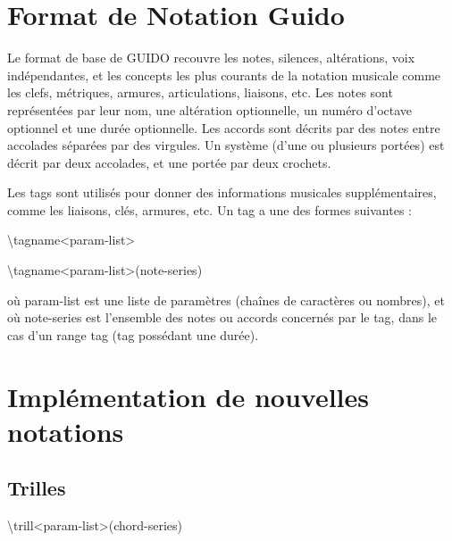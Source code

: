 \documentclass[a4paper,10pt,twocolumn]{article}
\newenvironment{code}
  {\fontfamily{pnc}\selectfont}{}
\begin{document}
\section{Format de Notation Guido}


Le format de base de GUIDO recouvre les notes, silences, altérations, voix indépendantes, et les concepts les plus courants de la notation musicale comme les clefs, métriques, armures, articulations, liaisons, etc.
Les notes sont représentées par leur nom, une altération optionnelle, un numéro d’octave optionnel et une durée optionnelle. Les accords sont décrits par des notes entre accolades séparées par des virgules. Un système (d'une ou plusieurs portées) est décrit par deux accolades, et une portée par deux crochets.


Les tags sont utilisés pour donner des informations musicales supplémentaires, comme les liaisons, clés, armures, etc. Un tag a une des formes suivantes : 

\begin{code}
\textbackslash{}tagname\textless{}param-list\textgreater{}

\textbackslash{}tagname\textless{}param-list\textgreater{}(note-series)
\end{code}

où param-list est une liste de paramètres (chaînes de caractères ou nombres), et où note-series est l'ensemble des notes ou accords concernés par le tag, dans le cas d'un range tag (tag possédant une durée).

\section{Implémentation de nouvelles notations}

\subsection{Trilles}

\begin{code}
\textbackslash{}trill\textless{}param-list\textgreater{}(chord-series)
\end{code}
\\
\end{document}
